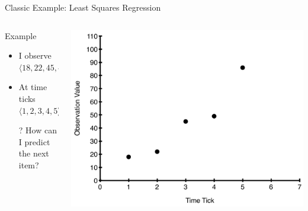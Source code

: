 \documentclass[aspectratio=169]{beamer}
\begin{document}
\begin{frame}{Classic Example: Least Squares Regression}

\begin{columns}
\begin{column}{0.5\textwidth}
Example
\begin{itemize}
\item I observe $\langle 18, 22, 45, 49, 86\rangle$
\item At time ticks $\langle 1, 2, 3, 4, 5\rangle$
\item[?] How can I predict the next item?
\end{itemize}
\end{column}
\begin{column}{0.5\textwidth}
\includegraphics[width=1\textwidth]{lectModel2/LSReg1.pdf}
\end{column}
\end{columns}
\end{frame}
\end{document}
